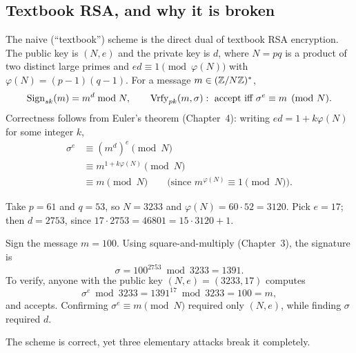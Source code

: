 \subsection{Textbook RSA, and why it is broken}
\label{ch22:textbook-rsa}

The naive (``textbook'') scheme is the direct dual of textbook RSA encryption. The public key is $(N, e)$ and the private key is $d$, where $N = pq$ is a product of two distinct large primes and $ed \equiv 1 \pmod{\varphi(N)}$ with $\varphi(N) = (p-1)(q-1)$. For a message $m \in (\mathbb{Z}/N\mathbb{Z})^{*}$,
\[
  \operatorname{Sign}_{sk}(m) = m^{d} \bmod N, \qquad
  \operatorname{Vrfy}_{pk}(m, \sigma): \text{ accept iff } \sigma^{e} \equiv m \pmod N.
\]
Correctness follows from Euler's theorem (Chapter~4): writing $ed = 1 + k\varphi(N)$ for some integer $k$,
\begin{align*}
  \sigma^{e} &\equiv (m^{d})^{e} \pmod N \\
             &\equiv m^{1 + k\varphi(N)} \pmod N \\
             &\equiv m \pmod N \qquad\text{(since $m^{\varphi(N)} \equiv 1 \pmod N$).}
\end{align*}

\begin{example}
\label{ch22:ex-textbook}
Take $p = 61$ and $q = 53$, so $N = 3233$ and $\varphi(N) = 60 \cdot 52 = 3120$. Pick $e = 17$; then $d = 2753$, since $17 \cdot 2753 = 46801 = 15\cdot 3120 + 1$.

Sign the message $m = 100$. Using square-and-multiply (Chapter~3), the signature is
\[
  \sigma = 100^{2753} \bmod 3233 = 1391.
\]
To verify, anyone with the public key $(N, e) = (3233, 17)$ computes
\[
  \sigma^{e} \bmod 3233 = 1391^{17} \bmod 3233 = 100 = m,
\]
and accepts. Confirming $\sigma^e \equiv m \pmod N$ required only $(N, e)$, while finding $\sigma$ required $d$.
\end{example}

The scheme is correct, yet three elementary attacks break it completely.

